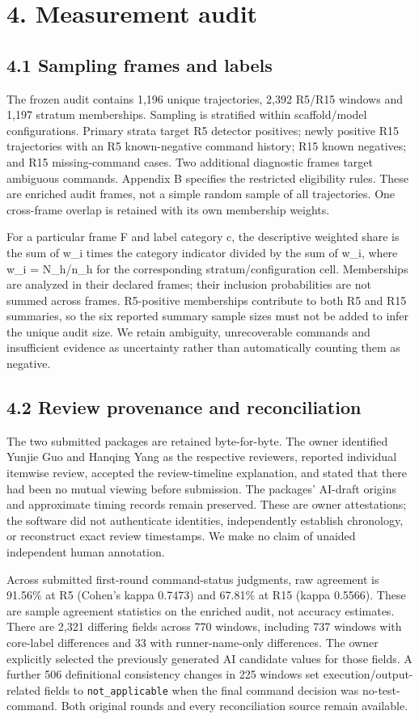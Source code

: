\documentclass[10pt,a4paper]{article}
\begin{document}
\section{4. Measurement audit}
\subsection{4.1 Sampling frames and labels}
The frozen audit contains 1,196 unique trajectories, 2,392 R5/R15 windows and 1,197 stratum memberships. Sampling is stratified within scaffold/model configurations. Primary strata target R5 detector positives; newly positive R15 trajectories with an R5 known-negative command history; R15 known negatives; and R15 missing-command cases. Two additional diagnostic frames target ambiguous commands. Appendix B specifies the restricted eligibility rules. These are enriched audit frames, not a simple random sample of all trajectories. One cross-frame overlap is retained with its own membership weights.

For a particular frame F and label category c, the descriptive weighted share is the sum of w\_i times the category indicator divided by the sum of w\_i, where w\_i = N\_h/n\_h for the corresponding stratum/configuration cell. Memberships are analyzed in their declared frames; their inclusion probabilities are not summed across frames. R5-positive memberships contribute to both R5 and R15 summaries, so the six reported summary sample sizes must not be added to infer the unique audit size. We retain ambiguity, unrecoverable commands and insufficient evidence as uncertainty rather than automatically counting them as negative.

\subsection{4.2 Review provenance and reconciliation}
The two submitted packages are retained byte-for-byte. The owner identified Yunjie Guo and Hanqing Yang as the respective reviewers, reported individual itemwise review, accepted the review-timeline explanation, and stated that there had been no mutual viewing before submission. The packages' AI-draft origins and approximate timing records remain preserved. These are owner attestations; the software did not authenticate identities, independently establish chronology, or reconstruct exact review timestamps. We make no claim of unaided independent human annotation.

Across submitted first-round command-status judgments, raw agreement is 91.56\% at R5 (Cohen's kappa 0.7473) and 67.81\% at R15 (kappa 0.5566). These are sample agreement statistics on the enriched audit, not accuracy estimates. There are 2,321 differing fields across 770 windows, including 737 windows with core-label differences and 33 with runner-name-only differences. The owner explicitly selected the previously generated AI candidate values for those fields. A further 506 definitional consistency changes in 225 windows set execution/output-related fields to \texttt{not\_applicable} when the final command decision was no-test-command. Both original rounds and every reconciliation source remain available.
\end{document}
